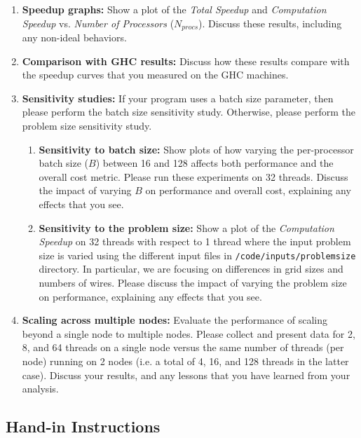 \documentclass[11pt]{article}
\begin{document}
\begin{enumerate}
\begin{enumerate}
\item \textbf{Speedup graphs:} Show a plot of the \textit{Total Speedup} and \textit{Computation Speedup} vs. \textit{Number of Processors} ($N_{procs}$). Discuss these results, including any non-ideal behaviors.

\item \textbf{Comparison with GHC results:} Discuss how these results compare with the speedup curves that you measured on the GHC machines.

\item \textbf{Sensitivity studies:} If your program uses a batch size parameter, then please perform the batch size sensitivity study. Otherwise, please perform the problem size sensitivity study.
\begin{enumerate}
\item \textbf{Sensitivity to batch size:} Show plots of how varying the per-processor batch size ($B$) between 16 and 128 affects both performance and the overall cost metric. Please run these experiments on 32 threads. Discuss the impact of varying $B$ on performance and overall cost, explaining any effects that you see.
\item \textbf{Sensitivity to the problem size:} Show a plot of the \textit{Computation Speedup} on 32 threads with respect to 1 thread where the input problem size is varied using the different input files in \texttt{/code/inputs/problemsize} directory. In particular, we are focusing on differences in grid sizes and numbers of wires. Please discuss the impact of varying the problem size on performance, explaining any effects that you see.
\end{enumerate}

\item \textbf{Scaling across multiple nodes:} Evaluate the performance of scaling beyond a single node to multiple nodes. Please collect and present data for 2, 8, and 64 threads on a single node versus the same number of threads (per node) running on 2 nodes (i.e. a total of 4, 16, and 128 threads in the latter case). Discuss your results, and any lessons that you have learned from your analysis.
\end{enumerate}
\end{enumerate}

\subsection*{Hand-in Instructions}
\end{document}
